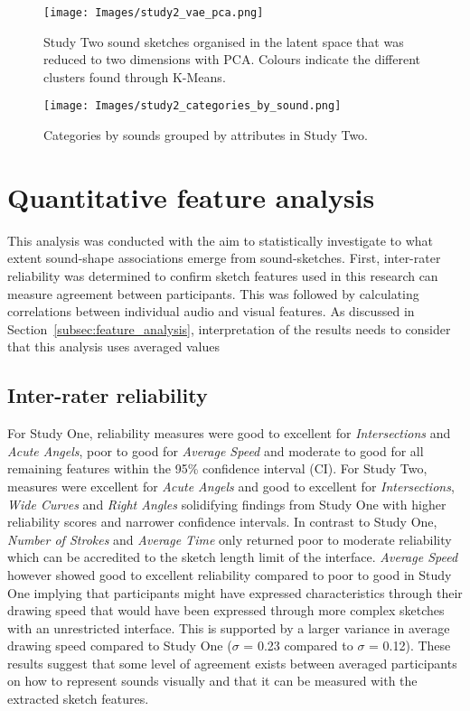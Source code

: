 \documentclass[]{interact}
\theoremstyle{plain}%
\theoremstyle{definition}
\theoremstyle{remark}
\begin{document}
\begin{figure}[h]
\centering
\texttt{[image: Images/study2\_vae\_pca.png]}
\caption{Study Two sound sketches organised in the latent space that was reduced to two dimensions with PCA. Colours indicate the different clusters found through K-Means.}\label{fig:study_two_categories}
\end{figure}

\begin{figure}[h]
\centering
\texttt{[image: Images/study2\_categories\_by\_sound.png]}
\caption{Categories by sounds grouped by attributes in Study Two.\label{fig:study2_categories_by_sound}}
\end{figure}

\section{Quantitative feature analysis}\label{sec:feature_analysis}
This analysis was conducted with the aim to statistically investigate to what extent sound-shape associations emerge from sound-sketches. First, inter-rater reliability was determined to confirm sketch features used in this research can measure agreement between participants. This was followed by calculating correlations between individual audio and visual features. As discussed in Section~\ref{subsec:feature_analysis}, interpretation of the results needs to consider that this analysis uses averaged values


\subsection{Inter-rater reliability}\label{subsec:inter-rater_reliability}
For Study One, reliability measures were good to excellent for \textit{Intersections} and \textit{Acute Angels}, poor to good for \textit{Average Speed} and moderate to good for all remaining features within the 95\% confidence interval (CI). For Study Two, measures were excellent for \textit{Acute Angels} and good to excellent for \textit{Intersections}, \textit{Wide Curves} and \textit{Right Angles} solidifying findings from Study One with higher reliability scores and narrower confidence intervals. In contrast to Study One, \textit{Number of Strokes} and \textit{Average Time} only returned poor to moderate reliability which can be accredited to the sketch length limit of the interface. \textit{Average Speed} however showed good to excellent reliability compared to poor to good in Study One implying that participants might have expressed characteristics through their drawing speed that would have been expressed through more complex sketches with an unrestricted interface. This is supported by a larger variance in average drawing speed compared to Study One ($\sigma$ = 0.23 compared to $\sigma$ = 0.12). These results suggest that some level of agreement exists between averaged participants on how to represent sounds visually and that it can be measured with the extracted sketch features.
\end{document}
